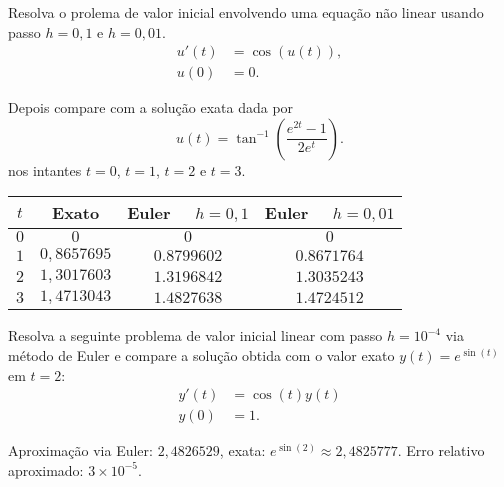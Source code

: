 \begin{exer} Resolva o prolema de valor inicial envolvendo uma equação não linear usando passo $h=0,1$ e $h=0,01$.
 \begin{equation}
  \begin{split}
    u'(t)&=\cos(u(t)),\\
    u(0)&=0.
  \end{split}
 \end{equation}

Depois compare com a solução exata dada por
\begin{equation}u(t)=\tan^{-1} \left( \frac {e^{2t}-1}{{2 e^t}}
 \right).
\end{equation}
nos intantes $t=0$, $t=1$, $t=2$ e $t=3$.
\end{exer}
\begin{resp}
\begin{center}
  \begin{tabular}{|c|c|c|c|}\hline
    $t$ &  Exato & Euler~~ $h=0,1$ & Euler~~ $h=0,01$\\\hline
    $0$ &  $0$ & $0$ & $0$\\\hline
    $1$ &   $0,8657695 $ & $ 0.8799602$   &   $0.8671764 $  \\\hline
    $2$ &   $1,3017603 $ & $ 1.3196842 $   &  $  1.3035243$     \\\hline
    $3$ &   $1,4713043 $  & $ 1.4827638 $ & $1.4724512 $   \\\hline
  \end{tabular}
\end{center}
\end{resp}

\begin{exer} Resolva a seguinte problema de valor inicial linear com passo $h=10^{-4}$ via método de Euler e compare a solução obtida com o valor exato $y(t)=e^{\sin(t)}$ em $t=2$:
 \begin{equation}
  \begin{split}
    y'(t)&=\cos(t)y(t)\\
    y(0)&=1.
  \end{split}
 \end{equation}
\end{exer}
\begin{resp}
 Aproximação via Euler: $2,4826529 $, exata: $e^{\sin(2)}\approx 2,4825777 $. Erro relativo aproximado: $ 3\times 10^{-5}$.
\end{resp}

